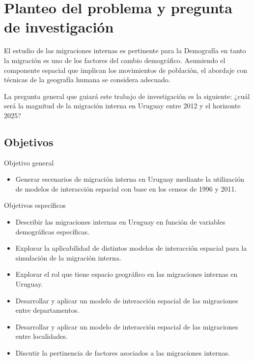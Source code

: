 \documentclass[12pt,spanish,]{article}
\providecommand{\tightlist}{%
  \setlength{\itemsep}{0pt}\setlength{\parskip}{0pt}}
\begin{document}
\newpage

\hypertarget{planteo-del-problema-y-pregunta-de-investigaciuxf3n}{%
\section{Planteo del problema y pregunta de
investigación}\label{planteo-del-problema-y-pregunta-de-investigaciuxf3n}}

El estudio de las migraciones internas es pertinente para la Demografía
en tanto la migración es uno de los factores del cambio demográfico.
Asumiendo el componente espacial que implican los movimientos de
población, el abordaje con técnicas de la geografía humana se considera
adecuado.

La pregunta general que guiará este trabajo de investigación es la
siguiente: ¿cuál será la magnitud de la migración interna en Uruguay
entre 2012 y el horizonte 2025?

\hypertarget{objetivos}{%
\subsection{Objetivos}\label{objetivos}}

Objetivo general

\begin{itemize}
\tightlist
\item
  Generar escenarios de migración interna en Uruguay mediante la
  utilización de modelos de interacción espacial con base en los censos
  de 1996 y 2011.
\end{itemize}

Objetivos específicos

\begin{itemize}
\item
  Describir las migraciones internas en Uruguay en función de variables
  demográficas específicas.
\item
  Explorar la aplicabilidad de distintos modelos de interacción espacial
  para la simulación de la migración interna.
\item
  Explorar el rol que tiene espacio geográfico en las migraciones
  internas en Uruguay.
\item
  Desarrollar y aplicar un modelo de interacción espacial de las
  migraciones entre departamentos.
\item
  Desarrollar y aplicar un modelo de interacción espacial de las
  migraciones entre localidades.
\item
  Discutir la pertinencia de factores asociados a las migraciones
  internas.
\end{itemize}
\end{document}
